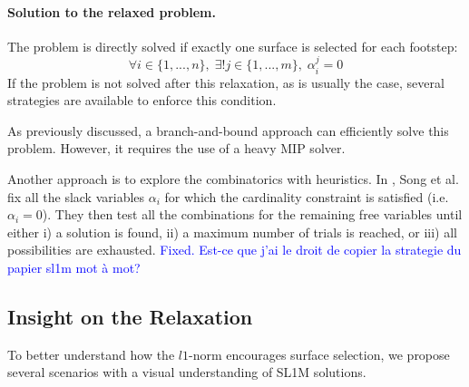 

\paragraph{Solution to the relaxed problem.\label{par:sl1m:solution_relaxed_heuristics}}
The problem is directly solved if exactly one surface is selected for each footstep:
\begin{equation}
    \label{eq:sl1m:pb_solved}
    \forall i \in \{1,...,n\},\; \exists! j \in \{1,...,m\},\; \alpha^j_i = 0
\end{equation}
If the problem is not solved after this relaxation, as is usually the case, several strategies are available to enforce this condition.

As previously discussed, a branch-and-bound approach can efficiently solve this problem. 
However, it requires the use of a heavy MIP solver.

Another approach is to explore the combinatorics with heuristics.
In \cite{sl1m_v2}, Song et al. fix all the slack variables $\alpha_i$ for which the cardinality constraint is satisfied (i.e. $\alpha_i=0$). 
They then test all the combinations for the remaining free variables until either i) a solution is found, ii) a maximum number of trials is reached, or iii) all possibilities are exhausted.  \textcolor{blue}{Fixed. Est-ce que j'ai le droit de copier la strategie du papier sl1m mot à mot?}

\subsection{Insight on the Relaxation}
\label{subsub:insight_l1}
To better understand how the $l1$-norm encourages surface selection, we propose several scenarios with a visual understanding of SL1M solutions.

